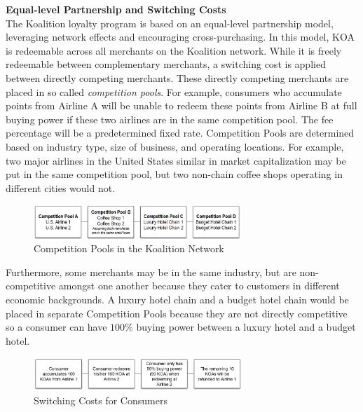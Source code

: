 \noindent \textbf{Equal-level Partnership and Switching Costs} \\
The Koalition loyalty program is based on an equal-level partnership model, leveraging network effects and encouraging cross-purchasing. In this model, KOA is redeemable across all merchants on the Koalition network. While it is freely redeemable between complementary merchants, a switching cost is applied between directly competing merchants. These directly competing merchants are placed in so called \textit{competition pools}. For example, consumers who accumulate points from Airline A will be unable to redeem these points from Airline B at full buying power if these two airlines are in the same competition pool. The fee percentage will be a predetermined fixed rate. Competition Pools are determined based on industry type, size of business, and operating locations. For example, two major airlines in the United States similar in market capitalization may be put in the same competition pool, but two non-chain coffee shops operating in different cities would not.
%
\begin{figure}[h] %
    \centering
        \includegraphics[keepaspectratio, width=0.7\textwidth]{images/competitionpool.png}
    \caption{Competition Pools in the Koalition Network} \label{fig:competitionpool}
\end{figure}

Furthermore, some merchants may be in the same industry, but are non-competitive amongst one another because they cater to customers in different economic backgrounds. A luxury hotel chain and a budget hotel chain would be placed in separate Competition Pools because they are not directly competitive so a consumer can have $100\%$ buying power between a luxury hotel and a budget hotel. 
%
\begin{figure}[h] %
    \centering
        \includegraphics[keepaspectratio, width=0.7\textwidth]{images/switchingcost.png}
    \caption{Switching Costs for Consumers} \label{fig:switchingcost}
\end{figure}

